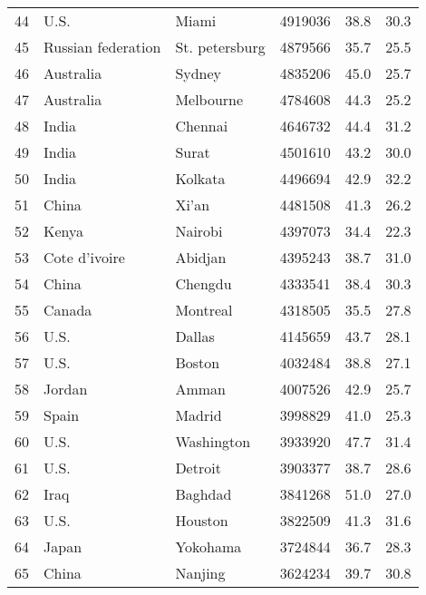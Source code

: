 \begin{center}
\begin{longtable}{clllcc}
  44 &                U.S. &           Miami &    4919036 &     38.8 &     30.3 \\
  45 &  Russian federation &  St. petersburg &    4879566 &     35.7 &     25.5 \\
  46 &           Australia &          Sydney &    4835206 &     45.0 &     25.7 \\
  47 &           Australia &       Melbourne &    4784608 &     44.3 &     25.2 \\
  48 &               India &         Chennai &    4646732 &     44.4 &     31.2 \\
  49 &               India &           Surat &    4501610 &     43.2 &     30.0 \\
  50 &               India &         Kolkata &    4496694 &     42.9 &     32.2 \\
  51 &               China &           Xi'an &    4481508 &     41.3 &     26.2 \\
  52 &               Kenya &         Nairobi &    4397073 &     34.4 &     22.3 \\
  53 &       Cote d'ivoire &         Abidjan &    4395243 &     38.7 &     31.0 \\
  54 &               China &         Chengdu &    4333541 &     38.4 &     30.3 \\
  55 &              Canada &        Montreal &    4318505 &     35.5 &     27.8 \\
  56 &                U.S. &          Dallas &    4145659 &     43.7 &     28.1 \\
  57 &                U.S. &          Boston &    4032484 &     38.8 &     27.1 \\
  58 &              Jordan &           Amman &    4007526 &     42.9 &     25.7 \\
  59 &               Spain &          Madrid &    3998829 &     41.0 &     25.3 \\
  60 &                U.S. &      Washington &    3933920 &     47.7 &     31.4 \\
  61 &                U.S. &         Detroit &    3903377 &     38.7 &     28.6 \\
  62 &                Iraq &         Baghdad &    3841268 &     51.0 &     27.0 \\
  63 &                U.S. &         Houston &    3822509 &     41.3 &     31.6 \\
  64 &               Japan &        Yokohama &    3724844 &     36.7 &     28.3 \\
  65 &               China &         Nanjing &    3624234 &     39.7 &     30.8 \\

\end{longtable}
\end{center}
